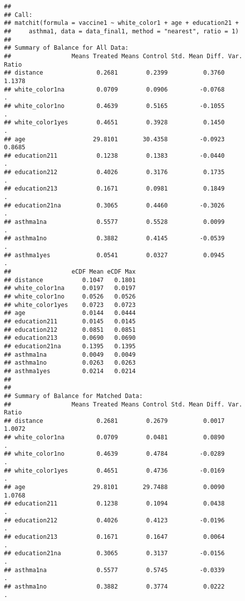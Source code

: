 \documentclass[
]{article}
\begin{document}
\begin{verbatim}
## 
## Call:
## matchit(formula = vaccine1 ~ white_color1 + age + education21 + 
##     asthma1, data = data_final1, method = "nearest", ratio = 1)
## 
## Summary of Balance for All Data:
##                 Means Treated Means Control Std. Mean Diff. Var. Ratio
## distance               0.2681        0.2399          0.3760     1.1378
## white_color1na         0.0709        0.0906         -0.0768          .
## white_color1no         0.4639        0.5165         -0.1055          .
## white_color1yes        0.4651        0.3928          0.1450          .
## age                   29.8101       30.4358         -0.0923     0.8685
## education211           0.1238        0.1383         -0.0440          .
## education212           0.4026        0.3176          0.1735          .
## education213           0.1671        0.0981          0.1849          .
## education21na          0.3065        0.4460         -0.3026          .
## asthma1na              0.5577        0.5528          0.0099          .
## asthma1no              0.3882        0.4145         -0.0539          .
## asthma1yes             0.0541        0.0327          0.0945          .
##                 eCDF Mean eCDF Max
## distance           0.1047   0.1801
## white_color1na     0.0197   0.0197
## white_color1no     0.0526   0.0526
## white_color1yes    0.0723   0.0723
## age                0.0144   0.0444
## education211       0.0145   0.0145
## education212       0.0851   0.0851
## education213       0.0690   0.0690
## education21na      0.1395   0.1395
## asthma1na          0.0049   0.0049
## asthma1no          0.0263   0.0263
## asthma1yes         0.0214   0.0214
## 
## 
## Summary of Balance for Matched Data:
##                 Means Treated Means Control Std. Mean Diff. Var. Ratio
## distance               0.2681        0.2679          0.0017     1.0072
## white_color1na         0.0709        0.0481          0.0890          .
## white_color1no         0.4639        0.4784         -0.0289          .
## white_color1yes        0.4651        0.4736         -0.0169          .
## age                   29.8101       29.7488          0.0090     1.0768
## education211           0.1238        0.1094          0.0438          .
## education212           0.4026        0.4123         -0.0196          .
## education213           0.1671        0.1647          0.0064          .
## education21na          0.3065        0.3137         -0.0156          .
## asthma1na              0.5577        0.5745         -0.0339          .
## asthma1no              0.3882        0.3774          0.0222          .

\end{verbatim}
\end{document}
